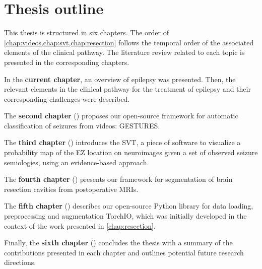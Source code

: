 \section{Thesis outline}

This thesis is structured in six chapters.
The order of \cref{chap:videos,chap:svt,chap:resection} follows the temporal order of the associated elements of the clinical pathway.
The literature review related to each topic is presented in the corresponding chapters.

In the \textbf{current chapter}, an overview of epilepsy was presented.
Then, the relevant elements in the clinical pathway for the treatment of epilepsy and their corresponding challenges were described.

The \textbf{second chapter} () proposes our open-source framework for automatic classification of seizures from videos: \ac{GESTURES}.

The \textbf{third chapter} () introduces the \ac{SVT}, a piece of software to visualize a probability map of the \ac{EZ} location on neuroimages given a set of observed seizure semiologies, using an evidence-based approach.

The \textbf{fourth chapter} () presents our framework for segmentation of brain resection cavities from postoperative \acp{MRI}.

The \textbf{fifth chapter} () describes our open-source Python library for data loading, preprocessing and augmentation TorchIO, which was initially developed in the context of the work presented in \cref{chap:resection}.

Finally, the \textbf{sixth chapter} () concludes the thesis with a summary of the contributions presented in each chapter and outlines potential future research directions.

